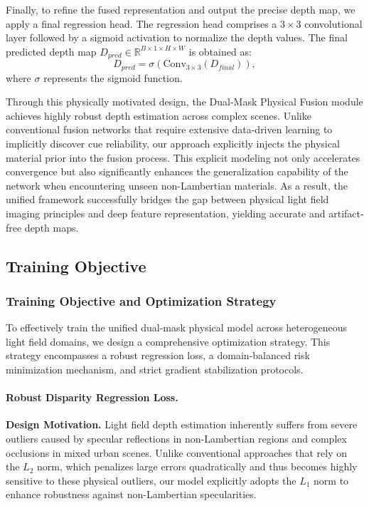 Finally, to refine the fused representation and output the precise depth map, we apply a final regression head. The regression head comprises a $3 \times 3$ convolutional layer followed by a sigmoid activation to normalize the depth values. The final predicted depth map $D_{pred} \in \mathbb{R}^{B \times 1 \times H \times W}$ is obtained as:
\begin{equation}
\label{eq:eq26}
D_{pred} = \sigma(\text{Conv}_{3 \times 3}(D_{final})),
\end{equation}
where $\sigma$ represents the sigmoid function. 

Through this physically motivated design, the Dual-Mask Physical Fusion module achieves highly robust depth estimation across complex scenes. Unlike conventional fusion networks that require extensive data-driven learning to implicitly discover cue reliability, our approach explicitly injects the physical material prior into the fusion process. This explicit modeling not only accelerates convergence but also significantly enhances the generalization capability of the network when encountering unseen non-Lambertian materials. As a result, the unified framework successfully bridges the gap between physical light field imaging principles and deep feature representation, yielding accurate and artifact-free depth maps.

\subsection{Training Objective}

\subsubsection{Training Objective and Optimization Strategy}

To effectively train the unified dual-mask physical model across heterogeneous light field domains, we design a comprehensive optimization strategy. This strategy encompasses a robust regression loss, a domain-balanced risk minimization mechanism, and strict gradient stabilization protocols. 

\paragraph{Robust Disparity Regression Loss.}

\textbf{Design Motivation.} Light field depth estimation inherently suffers from severe outliers caused by specular reflections in non-Lambertian regions and complex occlusions in mixed urban scenes. Unlike conventional approaches that rely on the $L_2$ norm, which penalizes large errors quadratically and thus becomes highly sensitive to these physical outliers, our model explicitly adopts the $L_1$ norm to enhance robustness against non-Lambertian specularities.

